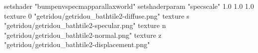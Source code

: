 setshader "bumpenvspecmapparallaxworld"
setshaderparam "specscale" 1.0 1.0 1.0
texture 0 "getridou/getridou_bathtile2-diffuse.png"
texture s "getridou/getridou_bathtile2-specular.png"
texture n "getridou/getridou_bathtile2-normal.png"
texture z "getridou/getridou_bathtile2-displacement.png"


